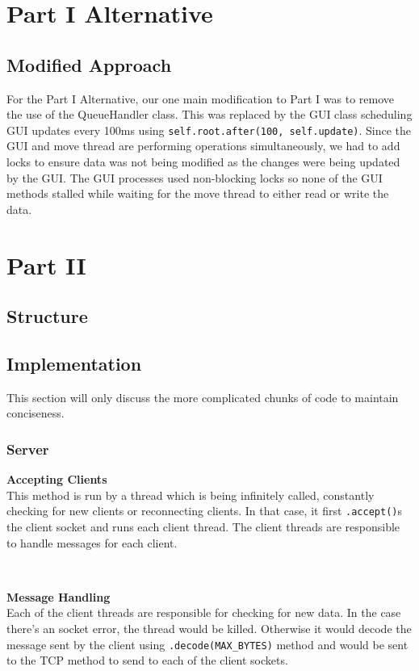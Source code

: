 \documentclass{article}
\begin{document}
\section{Part I Alternative}

\subsection{Modified Approach}
For the Part I Alternative, our one main modification to Part I was to remove the use of the QueueHandler class. This was replaced by the GUI class scheduling GUI updates every 100ms using \texttt{self.root.after(100, self.update)}. Since the GUI and move thread are performing operations simultaneously, we had to add locks to ensure data was not being modified as the changes were being updated by the GUI. The GUI processes used non-blocking locks so none of the GUI methods stalled while waiting for the move thread to either read or write the data.

\section{Part II}
\subsection{Structure}

\subsection{Implementation}
This section will only discuss the more complicated chunks of code to maintain conciseness.
\subsubsection{Server}
{\small \textbf{Accepting Clients}} \\
This method is run by a thread which is being infinitely called, constantly checking for new clients or reconnecting clients. In that case, it first \texttt{.accept()}s the client socket and runs each client thread. The client threads are responsible to handle messages for each client.

\

{\small \textbf{Message Handling}} \\
Each of the client threads are responsible for checking for new data. In the case there's an socket error, the thread would be killed. Otherwise it would decode the message sent by the client using \texttt{.decode(MAX\_BYTES)} method and would be sent to the TCP method to send to each of the client sockets.
\end{document}
